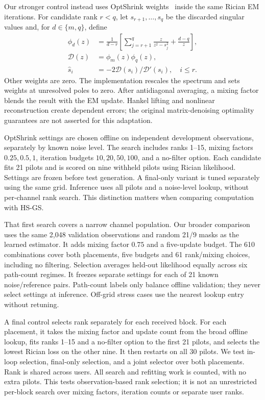 \documentclass[10pt,journal,letterpaper]{IEEEtran}
\begin{document}
Our stronger control instead uses OptShrink weights~\cite{nadakuditi2014} inside the same Rician EM iterations. For candidate rank $r<q$, let $s_{r+1},\ldots,s_q$ be the discarded singular values and, for $d\in\{m,q\}$, define
\begin{align}
 \phi_d(z)&=\frac{1}{d-r}\left[\sum_{j=r+1}^{q}\frac{z}{z^2-s_j^2}+\frac{d-q}{z}\right],\\
 \mathcal D(z)&=\phi_m(z)\phi_q(z),\nonumber\\
 \widehat s_i&=-2\mathcal D(s_i)/\mathcal D'(s_i),\quad i\le r.
\end{align}
Other weights are zero. The implementation rescales the spectrum and sets weights at unresolved poles to zero. After antidiagonal averaging, a mixing factor blends the result with the EM update. Hankel lifting and nonlinear reconstruction create dependent errors; the original matrix-denoising optimality guarantees are not asserted for this adaptation.

OptShrink settings are chosen offline on independent development observations, separately by known noise level. The search includes ranks 1--15, mixing factors $0.25,0.5,1$, iteration budgets $10,20,50,100$, and a no-filter option. Each candidate fits 21 pilots and is scored on nine withheld pilots using Rician likelihood. Settings are frozen before test generation. A final-only variant is tuned separately using the same grid. Inference uses all pilots and a noise-level lookup, without per-channel rank search. This distinction matters when comparing computation with HS-GS.

That first search covers a narrow channel population. Our broader comparison uses the same 2,048 validation observations and random 21/9 masks as the learned estimator. It adds mixing factor $0.75$ and a five-update budget. The 610 combinations cover both placements, five budgets and 61 rank/mixing choices, including no filtering. Selection averages held-out likelihood equally across six path-count regimes. It freezes separate settings for each of 21 known noise/reference pairs. Path-count labels only balance offline validation; they never select settings at inference. Off-grid stress cases use the nearest lookup entry without retuning.

A final control selects rank separately for each received block. For each placement, it takes the mixing factor and update count from the broad offline lookup, fits ranks 1--15 and a no-filter option to the first 21 pilots, and selects the lowest Rician loss on the other nine. It then restarts on all 30 pilots. We test in-loop selection, final-only selection, and a joint selector over both placements. Rank is shared across users. All search and refitting work is counted, with no extra pilots. This tests observation-based rank selection; it is not an unrestricted per-block search over mixing factors, iteration counts or separate user ranks.
\end{document}
